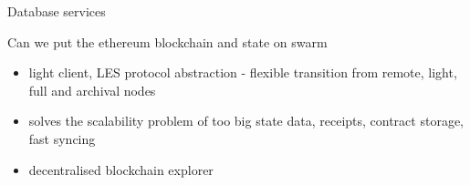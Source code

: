 \begin{subsection}{Database services}


\begin{frame}
\begin{block}{Can we put the ethereum blockchain and state on swarm}
\begin{itemize}
 \item light client, LES protocol abstraction - flexible transition from remote, light, full and archival nodes
 \item solves the scalability problem of too big state data, receipts, contract storage, fast syncing
 \item decentralised blockchain explorer
\end{itemize}
\end{block}
\end{frame}

\end{subsection}



